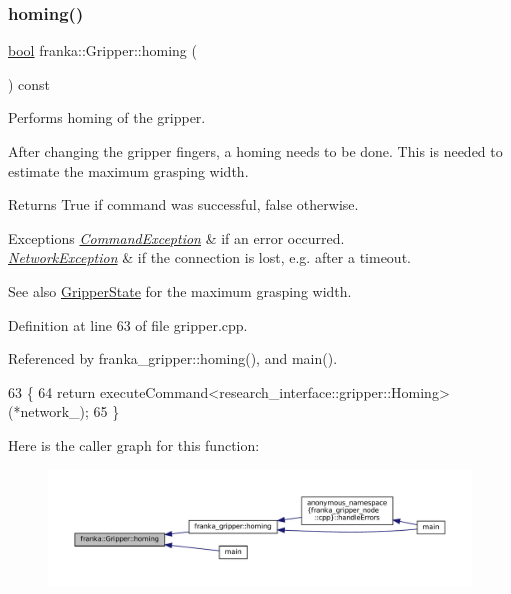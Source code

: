 \subsubsection{\texorpdfstring{homing()}{homing()}}
{\footnotesize\ttfamily \hyperlink{classbool}{bool} franka\+::\+Gripper\+::homing (\begin{DoxyParamCaption}{ }\end{DoxyParamCaption}) const}

Performs homing of the gripper.

After changing the gripper fingers, a homing needs to be done. This is needed to estimate the maximum grasping width.

\begin{DoxyReturn}{Returns}
True if command was successful, false otherwise.
\end{DoxyReturn}

\begin{DoxyExceptions}{Exceptions}
{\em \hyperlink{structfranka_1_1CommandException}{Command\+Exception}} & if an error occurred. \\
\hline
{\em \hyperlink{structfranka_1_1NetworkException}{Network\+Exception}} & if the connection is lost, e.\+g. after a timeout.\\
\hline
\end{DoxyExceptions}
\begin{DoxySeeAlso}{See also}
\hyperlink{structfranka_1_1GripperState}{Gripper\+State} for the maximum grasping width. 
\end{DoxySeeAlso}


Definition at line 63 of file gripper.\+cpp.



Referenced by franka\+\_\+gripper\+::homing(), and main().


\begin{DoxyCode}
63                            \{
64   \textcolor{keywordflow}{return} executeCommand<research\_interface::gripper::Homing>(*network\_);
65 \}
\end{DoxyCode}
Here is the caller graph for this function\+:
\nopagebreak
\begin{figure}[H]
\begin{center}
\leavevmode
\includegraphics[width=350pt]{classfranka_1_1Gripper_aef356f93a4c3b9d6b2532c29126d478c_icgraph}
\end{center}
\end{figure}
\mbox{\label{classfranka_1_1Gripper_a047bc39267d66d6fb26c4c70669d68c2}} 
